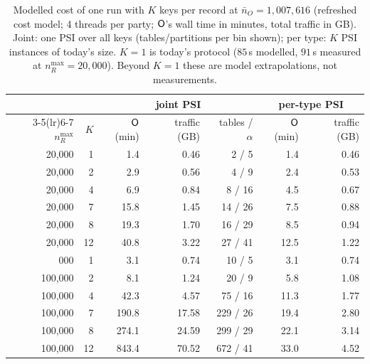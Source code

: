 \begin{table}[t]\centering\small
\caption{Modelled cost of one run with $K$ keys per record at $\bar n_O=1{,}007{,}616$ (refreshed cost model; 4 threads per
party; $\mathsf{O}$'s wall time in minutes, total traffic in GB). Joint: one PSI over all keys (tables/partitions per bin
shown); per type: $K$ PSI instances of today's size. $K=1$ is today's protocol ($85$\,s modelled, $91$\,s measured at
$n_R^{\max}=20{,}000$). Beyond $K=1$ these are model extrapolations, not measurements.}\label{tab:cost}
\begin{tabular}{@{}rrrrrrr@{}}\toprule
 & & \multicolumn{3}{c}{joint PSI} & \multicolumn{2}{c}{per-type PSI}\\\cmidrule(lr){3-5}\cmidrule(lr){6-7}
$n_R^{\max}$ & $K$ & $\mathsf{O}$ (min) & traffic (GB) & tables / $\alpha$ & $\mathsf{O}$ (min) & traffic (GB)\\\midrule
20{,}000 & 1 & 1.4 & 0.46 & 2 / 5 & 1.4 & 0.46 \\
20{,}000 & 2 & 2.9 & 0.56 & 4 / 9 & 2.4 & 0.53 \\
20{,}000 & 4 & 6.9 & 0.84 & 8 / 16 & 4.5 & 0.67 \\
20{,}000 & 7 & 15.8 & 1.45 & 14 / 26 & 7.5 & 0.88 \\
20{,}000 & 8 & 19.3 & 1.70 & 16 / 29 & 8.5 & 0.94 \\
20{,}000 & 12 & 40.8 & 3.22 & 27 / 41 & 12.5 & 1.22 \\
\addlinespace
100{,}000 & 1 & 3.1 & 0.74 & 10 / 5 & 3.1 & 0.74 \\
100{,}000 & 2 & 8.1 & 1.24 & 20 / 9 & 5.8 & 1.08 \\
100{,}000 & 4 & 42.3 & 4.57 & 75 / 16 & 11.3 & 1.77 \\
100{,}000 & 7 & 190.8 & 17.58 & 229 / 26 & 19.4 & 2.80 \\
100{,}000 & 8 & 274.1 & 24.59 & 299 / 29 & 22.1 & 3.14 \\
100{,}000 & 12 & 843.4 & 70.52 & 672 / 41 & 33.0 & 4.52 \\
\bottomrule\end{tabular}\end{table}
